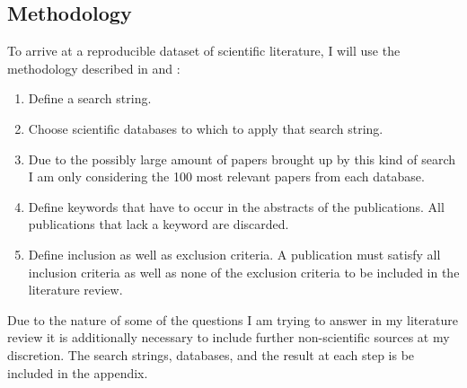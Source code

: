 \documentclass[
	11pt,								%
	DIV10,								%
	a4paper,         					%
	oneside,							%
	headheight=20pt,					%
	footheight=20pt,					%
    parskip=full,						%
    listof=totoc,						%
	bibliography=totoc,					%
	index=totoc,						%
]{scrartcl}
\begin{document}
\subsection{Methodology}
To arrive at a reproducible dataset of scientific literature, I will use the methodology described in \cite{petersenSystematicMappingStudies} and \cite{pop00975}:

\begin{enumerate}
	\item Define a search string.
	\item Choose scientific databases to which to apply that search string.
	\item Due to the possibly large amount of papers brought up by this kind of search I am only considering the 100 most relevant papers from each database.
	\item Define keywords that have to occur in the abstracts of the publications. All publications that lack a keyword are discarded.
	\item Define inclusion as well as exclusion criteria. A publication must satisfy all inclusion criteria as well as none of the exclusion criteria to be included in the literature review.
\end{enumerate}
Due to the nature of some of the questions I am trying to answer in my literature review it is additionally necessary to include further non-scientific sources at my discretion.
The search strings, databases, and the result at each step is be included in the appendix.
\end{document}
